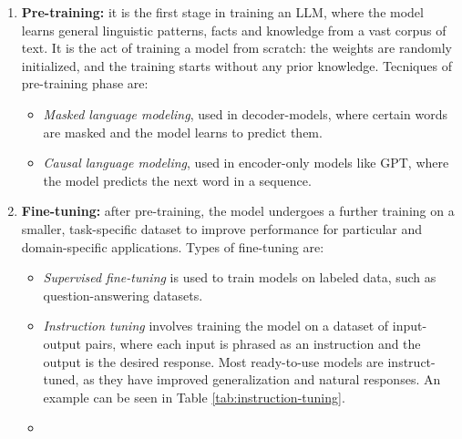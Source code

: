 \begin{enumerate}
    \item \textbf{Pre-training:} it is the first stage in training an LLM, where the model learns general linguistic patterns, facts and knowledge from a vast corpus of text. It is the act of training a model from scratch: the weights are randomly initialized, and the training starts without any prior knowledge. Tecniques of pre-training phase are:
    \begin{itemize}
        \item \textit{Masked language modeling}, used in decoder-models, where certain words are masked and the model learns to predict them.\cite{devlin2019bert}
        \item \textit{Causal language modeling}, used in encoder-only models like GPT,\cite{brown2020language} where the model predicts the next word in a sequence.
    \end{itemize}
    \item \textbf{Fine-tuning:} after pre-training, the model undergoes a further training on a smaller, task-specific dataset to improve performance for particular and domain-specific applications. Types of fine-tuning are:
    \begin{itemize}
        \item \textit{Supervised fine-tuning} is used to train models on labeled data, such as question-answering datasets.
        \item \textit{Instruction tuning} involves training the model on a dataset of input-output pairs, where each input is phrased as an instruction and the output is the desired response. Most ready-to-use models are instruct-tuned, as they have improved generalization and natural responses. An example can be seen in Table \ref{tab:instruction-tuning}.
        \item {}
    \end{itemize}
\end{enumerate}

